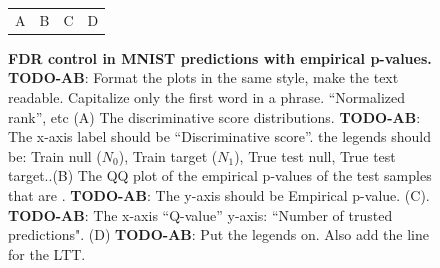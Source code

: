 \documentclass{article}
\newcommand{\todo}[2]{{\color{red} {\bf TODO-#1}: #2}}
\begin{document}
\begin{figure}[hp]
	\centering
	\begin{tabular}{cccc}
		A & B & C & D \\
	\end{tabular}
	\caption{{\bf FDR control in MNIST predictions with empirical p-values. }\todo{AB}{Format the plots in the same style, make the text readable.  Capitalize only the first word in a phrase. ``Normalized rank'', etc }
		(A) The discriminative score distributions. \todo{AB}{The x-axis label should be ``Discriminative score''. the legends should be: Train null ($N_0$), Train target ($N_1$), True test null, True test target.}.(B) The QQ plot of the empirical p-values of the test samples that are .  \todo{AB}{The y-axis should be Empirical p-value.} (C).  \todo{AB}{The x-axis ``Q-value'' y-axis: ``Number of trusted predictions".} (D) \todo{AB}{Put the legends on. Also add the line for the LTT.} }
	\label{fig:mnistshfit}
\end{figure}
   
\end{document}
